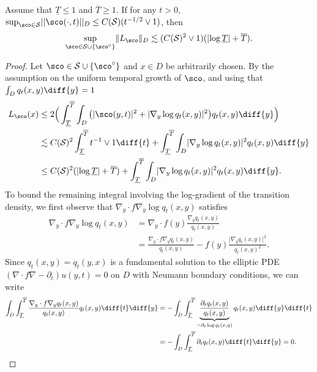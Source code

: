 \documentclass[a4paper, 11pt, headings = small, abstract]{scrartcl}
\begin{document}
\begin{lemma}\label{lem:scoreloss_bound}
 Assume that $\underline{T} \leq 1$ and $\overline{T} \geq 1$. If for any $t > 0$, $\sup_{\sco \in \mathcal{S}} \lvert \lvert \sco(\cdot,t) \rvert \rvert_{D} \leq C(\mathcal{S})(t^{-1/2} \vee 1)$, then 
\[\sup_{\sco \in \mathcal{S} \cup \{\sco^\circ\}} \lVert L_{\sco}\rVert_D \lesssim (C(\mathcal{S})^2 \vee 1) (\lvert\log \underline{T}\rvert + \overline{T}).\]
\end{lemma}
\begin{proof} 
Let $\sco \in \mathcal{S} \cup \{\sco^\circ\}$ and $x \in D$ be arbitrarily chosen. By the assumption on the uniform temporal growth of $\sco$, and using that $\int_D q_t(x,y) \diff{y} = 1$
\begin{align*}
L_{\sco}(x) &\leq 2\Big(\int_{\underline{T}}^{\overline{T}} \int_{D} \big(\lvert \sco(y,t)\rvert^2 + \lvert \nabla_y \log q_t(x,y) \rvert^2\big) q_t(x,y) \diff{y}\Big)\\ 
&\lesssim C(\mathcal{S})^2\int_{\underline{T}}^{\overline{T}}  t^{-1} \vee 1 \diff{t} + \int_{\underline{T}}^{\overline{T}} \int_{D}  \lvert \nabla_y \log q_t(x,y) \rvert^2 q_t(x,y) \diff{y}\\ 
&\leq C(\mathcal{S})^2(\lvert \log \underline{T} \rvert + \overline{T}) + \int_{\underline{T}}^{\overline{T}} \int_{D}  \lvert \nabla_y \log q_t(x,y) \rvert^2 q_t(x,y) \diff{y}. 
\end{align*}
To bound the remaining integral involving the log-gradient of the transition density, we first observe that  $\nabla_y \cdot f \nabla_y \log q_t(x,y)$ satisfies
\begin{align*} 
\nabla_y \cdot f \nabla_y \log q_t(x,y) &= \nabla_y \cdot f(y)\frac{\nabla_y q_t(x,y)}{q_t(x,y)} \\
&= \frac{\nabla_y \cdot f \nabla_y q_t(x,y)}{q_t(x,y)} - f(y) \frac{\lvert \nabla_y q_t(x,y) \rvert^2}{q_t(x,y)^2}. 
\end{align*}
Since $q_t(x,y) = q_t(y,x)$ is a fundamental solution to the elliptic PDE $(\nabla \cdot f \nabla -\partial_t) u(y,t) = 0$ on $D$ with Neumann boundary conditions, we can write 
\begin{align*} 
\int_{D} \int_{\underline{T}}^{\overline{T}} \frac{\nabla_y \cdot f\nabla_y q_t(x,y)}{q_t(x,y)} q_t(x,y) \diff{t} \diff{y} &= -\int_{D} \int_{\underline{T}}^{\overline{T}} \underbrace{\frac{\partial_t q_t(x,y)}{q_t(x,y)}}_{=\partial_t \log q_t(x,y)} q_t(x,y) \diff{y}\diff{t}\\
&=  -\int_D\int_{\underline{T}}^{\overline{T}} \partial_t q_t(x,y) \diff{t} \diff{y} = 0.

\end{align*}
\end{proof}
\end{document}
